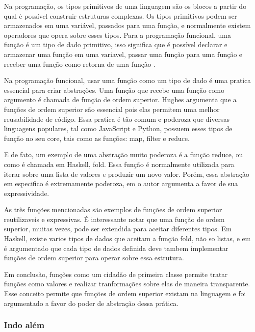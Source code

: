 Na programação, os tipos primitivos de uma linguagem são os blocos a partir do qual é possível construir estruturas complexas.
Os tipos primitivos podem ser armazenados em uma variável, passados para uma função, e normalmente existem operadores que opera sobre esses tipos.
Para a programação funcional, uma função é um tipo de dado primitivo, isso significa que é possível declarar e armazenar uma função em uma variavel, passar uma função para uma função e receber uma função como retorna de uma função \cite{whyfpm}.

Na programação funcional, usar uma função como um tipo de dado é uma pratica essencial para criar abstrações.
Uma função que recebe uma função como argumento é chamada de função de ordem superior.
Hughes \cite{whyfpm} argumenta que a funções de ordem superior são essencial pois elas permitem uma melhor reusabilidade de código.
Essa pratica é tão comum e poderoza que diversas linguagens populares, tal como JavaScript e Python, possuem esses tipos de função no seu core, tais como as funções: map, filter e reduce.

E de fato, um exemplo de uma abstração muito poderoza é a função reduce, ou como é chamada em Haskell, fold.
Essa função é normalmente utilizada para iterar sobre uma lista de valores e produzir um novo valor.
Porém, essa abstração em especifico é extremamente poderoza, em \cite{graham} o autor argumenta a favor de sua expressividade.

As três funções mencionadas são exemplos de funções de ordem superior reutilizaveis e expressivas.
É interessante notar que uma função de ordem superior, muitas vezes, pode ser extendida para aceitar diferentes tipos.
Em Haskell, existe varios tipos de dados que aceitam a função fold, não so listas, e em \cite{whyfpm} é argumentado que cada tipo de dados definida deve tambem implementar funções de ordem superior para operar sobre essa estrutura.


Em conclusão, funções como um cidadão de primeira classe permite tratar funções como valores e realizar tranformações sobre elas de maneira transparente.
Esse conceito permite que funções de ordem superior existam na linguagem e foi argumentado a favor do poder de abstração dessa prática.

\subsubsection{Indo além}

